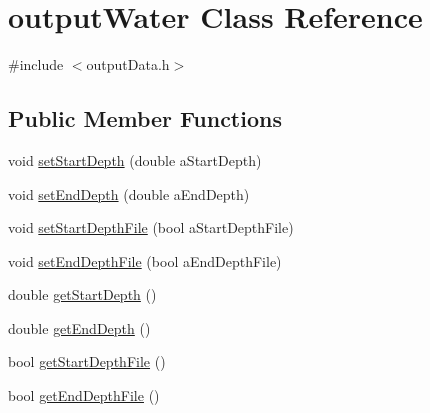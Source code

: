 \hypertarget{classoutput_water}{
\section{outputWater Class Reference}
\label{classoutput_water}
}


{\ttfamily \#include $<$outputData.h$>$}\subsection*{Public Member Functions}
\begin{DoxyCompactItemize}
\item 
void \hyperlink{classoutput_water_a18db06697bce4f493e43167e2136b84b}{setStartDepth} (double aStartDepth)
\item 
void \hyperlink{classoutput_water_ad6b2243ae9ff2bc9d251f32c4249f4aa}{setEndDepth} (double aEndDepth)
\item 
void \hyperlink{classoutput_water_af4819352d8eb0448dc3be329e5b76150}{setStartDepthFile} (bool aStartDepthFile)
\item 
void \hyperlink{classoutput_water_aa27e9da2e329ce41625a494745a9a594}{setEndDepthFile} (bool aEndDepthFile)
\item 
double \hyperlink{classoutput_water_ab7e3bf34250d2975447600911fad3a35}{getStartDepth} ()
\item 
double \hyperlink{classoutput_water_aec11bb25c47d1c0269cb128be2fd9113}{getEndDepth} ()
\item 
bool \hyperlink{classoutput_water_a97c06dddb83eb66a807c6566f62ac0d1}{getStartDepthFile} ()
\item 
bool \hyperlink{classoutput_water_aa98136f7e042a2215c8bd48c94ef09b6}{getEndDepthFile} ()
\end{DoxyCompactItemize}


